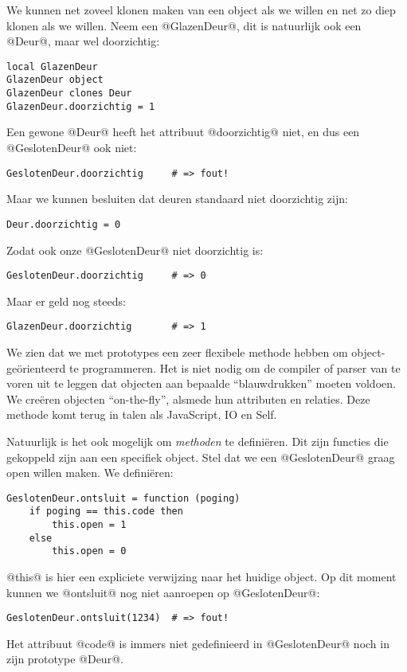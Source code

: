 We kunnen net zoveel klonen maken van een object als we willen en net zo diep klonen als we willen. Neem een @GlazenDeur@, dit is natuurlijk ook een @Deur@, maar wel doorzichtig:
\begin{lstlisting}[name=deuren]
local GlazenDeur
GlazenDeur object
GlazenDeur clones Deur
GlazenDeur.doorzichtig = 1
\end{lstlisting}
Een gewone @Deur@ heeft het attribuut @doorzichtig@ niet, en dus een @GeslotenDeur@ ook niet:
\begin{lstlisting}[name=deuren]
GeslotenDeur.doorzichtig     # => fout!
\end{lstlisting}
Maar we kunnen besluiten dat deuren standaard niet doorzichtig zijn:
\begin{lstlisting}[name=deuren]
Deur.doorzichtig = 0
\end{lstlisting}
Zodat ook onze @GeslotenDeur@ niet doorzichtig is:
\begin{lstlisting}[name=deuren]
GeslotenDeur.doorzichtig     # => 0
\end{lstlisting}
Maar er geld nog steeds:
\begin{lstlisting}[name=deuren]
GlazenDeur.doorzichtig       # => 1
\end{lstlisting}

We zien dat we met prototypes een zeer flexibele methode hebben om object-geörienteerd te programmeren. Het is niet nodig om de compiler of parser van te voren uit te leggen dat objecten aan bepaalde \enquote{blauwdrukken} moeten voldoen. We creëren objecten \enquote{on-the-fly}, alsmede hun attributen en relaties. Deze methode komt terug in talen als JavaScript, IO en Self.

Natuurlijk is het ook mogelijk om \emph{methoden} te definiëren. Dit zijn functies die gekoppeld zijn aan een specifiek object. Stel dat we een @GeslotenDeur@ graag open willen maken. We definiëren:
\begin{lstlisting}[name=deuren]
GeslotenDeur.ontsluit = function (poging)
    if poging == this.code then
        this.open = 1
    else
        this.open = 0
\end{lstlisting}
@this@ is hier een expliciete verwijzing naar het huidige object. Op dit moment kunnen we @ontsluit@ nog niet aanroepen op @GeslotenDeur@:
\begin{lstlisting}[name=deuren]
GeslotenDeur.ontsluit(1234)  # => fout!
\end{lstlisting}
Het attribuut @code@ is immers niet gedefinieerd in @GeslotenDeur@ noch in zijn prototype @Deur@.

